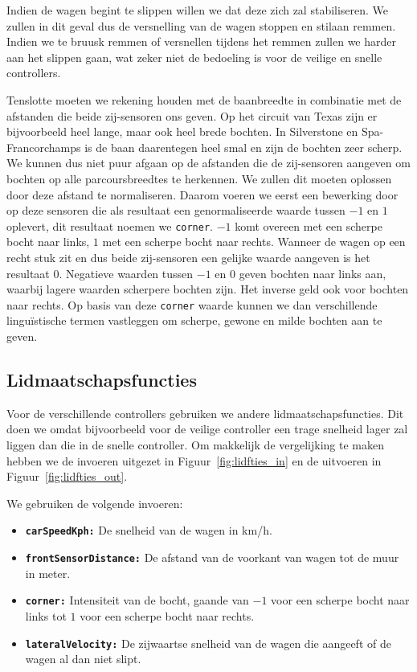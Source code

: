 Indien de wagen begint te slippen willen we dat deze zich zal stabiliseren. We zullen in dit geval dus de versnelling van de wagen stoppen en stilaan remmen. Indien we te bruusk remmen of versnellen tijdens het remmen zullen we harder aan het slippen gaan, wat zeker niet de bedoeling is voor de veilige en snelle controllers.

Tenslotte moeten we rekening houden met de baanbreedte in combinatie met de afstanden die beide
zij-sensoren ons geven. Op het circuit van Texas zijn er bijvoorbeeld heel lange, maar ook heel
brede bochten. In Silverstone en Spa-Francorchamps is de baan daarentegen heel smal en zijn de
bochten zeer scherp. We kunnen dus niet puur afgaan op de afstanden die de
zij-sensoren aangeven om bochten op alle parcoursbreedtes te herkennen. We zullen dit moeten oplossen door deze
afstand te normaliseren. Daarom voeren we eerst een bewerking door op deze sensoren
die als resultaat een genormaliseerde waarde tussen $-1$ en $1$ oplevert, dit
resultaat noemen we \texttt{corner}. $-1$ komt overeen met een scherpe bocht
naar links, $1$ met een scherpe bocht naar rechts. Wanneer de wagen op een recht
stuk zit en dus beide zij-sensoren een gelijke waarde aangeven is het resultaat
$0$. Negatieve waarden tussen $-1$ en $0$ geven bochten naar links aan, waarbij
lagere waarden scherpere bochten zijn. Het inverse geld ook voor bochten naar
rechts. Op basis van deze \texttt{corner} waarde kunnen we dan verschillende
linguïstische termen vastleggen om scherpe, gewone en milde bochten aan te geven.

\subsection{Lidmaatschapsfuncties}

Voor de verschillende controllers gebruiken we andere lidmaatschapsfuncties. Dit 
doen we omdat bijvoorbeeld voor de veilige controller een trage snelheid lager 
zal liggen dan die in de snelle controller. Om makkelijk de vergelijking te maken hebben we de invoeren uitgezet in Figuur~\ref{fig:lidfties_in} en de uitvoeren in Figuur~\ref{fig:lidfties_out}.



We gebruiken de volgende invoeren:
\begin{itemize}
\item \texttt{\textbf{carSpeedKph:}} De snelheid van de wagen in km/h.
\item \texttt{\textbf{frontSensorDistance:}} De afstand van de voorkant van wagen tot de muur in meter.
\item \texttt{\textbf{corner:}} Intensiteit van de bocht, gaande van $-1$ voor een scherpe bocht naar links tot $1$ voor een scherpe bocht naar rechts. 
\item \texttt{\textbf{lateralVelocity:}} De zijwaartse snelheid van de wagen die aangeeft of de wagen al dan niet slipt.
\end{itemize}

